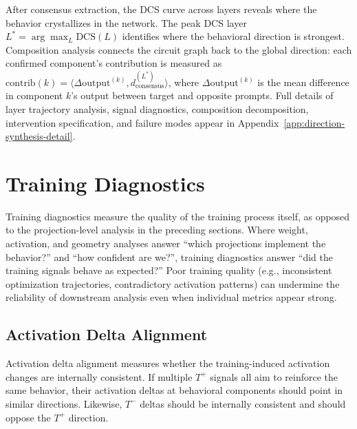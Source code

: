 \documentclass[11pt]{article}
\begin{document}
After consensus extraction, the DCS curve across layers reveals where the behavior crystallizes in the network. The peak DCS layer $L^* = \arg\max_L \text{DCS}(L)$ identifies where the behavioral direction is strongest. Composition analysis connects the circuit graph back to the global direction: each confirmed component's contribution is measured as $\text{contrib}(k) = \langle \Delta\text{output}^{(k)}, d^{(L^*)}_{\text{consensus}} \rangle$, where $\Delta\text{output}^{(k)}$ is the mean difference in component $k$'s output between target and opposite prompts. Full details of layer trajectory analysis, signal diagnostics, composition decomposition, intervention specification, and failure modes appear in Appendix~\ref{app:direction-synthesis-detail}.

\section{Training Diagnostics}
\label{sec:training-diagnostics}

Training diagnostics measure the quality of the training process itself, as opposed to the projection-level analysis in the preceding sections. Where weight, activation, and geometry analyses answer ``which projections implement the behavior?'' and ``how confident are we?'', training diagnostics answer ``did the training signals behave as expected?'' Poor training quality (e.g., inconsistent optimization trajectories, contradictory activation patterns) can undermine the reliability of downstream analysis even when individual metrics appear strong.

\subsection{Activation Delta Alignment}
\label{sec:activation-delta-alignment}

Activation delta alignment measures whether the training-induced activation changes are internally consistent. If multiple $T^+$ signals all aim to reinforce the same behavior, their activation deltas at behavioral components should point in similar directions. Likewise, $T^-$ deltas should be internally consistent and should oppose the $T^+$ direction.
\end{document}
